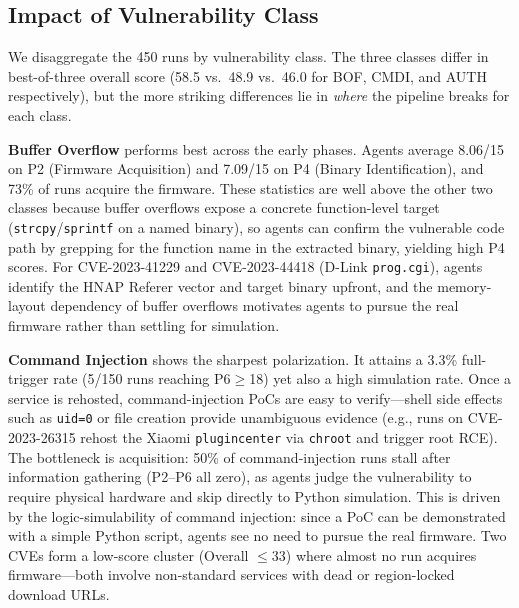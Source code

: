 \subsection{Impact of Vulnerability Class}



We disaggregate the 450 runs by vulnerability class. The three classes differ in best-of-three overall score (58.5 vs.\ 48.9 vs.\ 46.0 for BOF, CMDI, and AUTH respectively), but the more striking differences lie in \emph{where} the pipeline breaks for each class.


\noindent\textbf{Buffer Overflow} performs best across the early phases. Agents average 8.06/15 on P2 (Firmware Acquisition) and 7.09/15 on P4 (Binary Identification), and 73\% of runs acquire the firmware. These statistics are well above the other two classes because buffer overflows expose a concrete function-level target (\texttt{strcpy}/\texttt{sprintf} on a named binary), so agents can confirm the vulnerable code path by grepping for the function name in the extracted binary, yielding high P4 scores. For CVE-2023-41229 and CVE-2023-44418 (D-Link \texttt{prog.cgi}), agents identify the HNAP Referer vector and target binary upfront, and the memory-layout dependency of buffer overflows motivates agents to pursue the real firmware rather than settling for simulation.


\noindent\textbf{Command Injection} shows the sharpest polarization. It attains a 3.3\% full-trigger rate (5/150 runs reaching P6$\geq$18) yet also a high simulation rate. Once a service is rehosted, command-injection PoCs are easy to verify---shell side effects such as \texttt{uid=0} or file creation provide unambiguous evidence (e.g., runs on CVE-2023-26315 rehost the Xiaomi \texttt{plugincenter} via \texttt{chroot} and trigger root RCE). The bottleneck is acquisition: 50\% of command-injection runs stall after information gathering (P2--P6 all zero), as agents judge the vulnerability to require physical hardware and skip directly to Python simulation. This is driven by the logic-simulability of command injection: since a PoC can be demonstrated with a simple Python script, agents see no need to pursue the real firmware. Two CVEs form a low-score cluster (Overall $\leq$33) where almost no run acquires firmware---both involve non-standard services with dead or region-locked download URLs.


